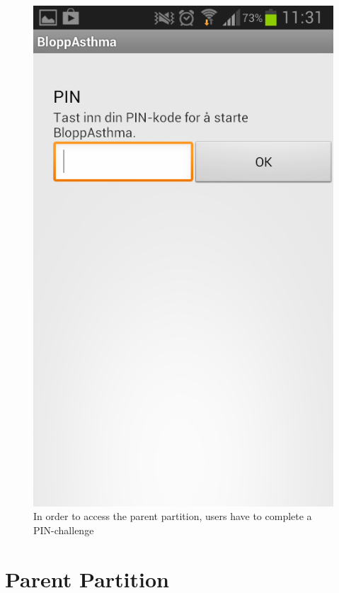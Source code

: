 \begin{figure}
\begin{minipage}[t]{0.4\linewidth}
			\includegraphics[width=0.20\paperwidth]{Pictures/new-screenshots/pin-challenge.png}
		\caption{In order to access the parent partition, users have to complete a PIN-challenge}
		\label{fig:parent-pin}
	\end{minipage}
\end{figure}

\section{Parent Partition}

